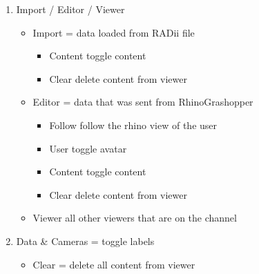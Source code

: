 \documentclass[letterpaper,10pt,english]{sphinxmanual}
\begin{document}
\sphinxAtStartPar
{}
\begin{enumerate}
%
\setcounter{enumi}{8}
\item {} 
\sphinxAtStartPar
Import / Editor / Viewer
\begin{itemize}
\item {} 
\sphinxAtStartPar
Import = data loaded from RADii file
\begin{itemize}
\item {} 
\sphinxAtStartPar
Content \sphinxhyphen{} toggle content

\item {} 
\sphinxAtStartPar
Clear \sphinxhyphen{} delete content from viewer

\end{itemize}

\item {} 
\sphinxAtStartPar
Editor = data that was sent from RhinoGrashopper
\begin{itemize}
\item {} 
\sphinxAtStartPar
Follow \sphinxhyphen{} follow the rhino view of the user

\item {} 
\sphinxAtStartPar
User toggle avatar

\item {} 
\sphinxAtStartPar
Content \sphinxhyphen{} toggle content

\item {} 
\sphinxAtStartPar
Clear \sphinxhyphen{} delete content from viewer

\end{itemize}

\item {} 
\sphinxAtStartPar
Viewer  all other viewers that are on the channel

\end{itemize}

\item {} 
\sphinxAtStartPar
Data \& Cameras = toggle labels
\begin{itemize}
\item {} 
\sphinxAtStartPar
Clear = delete all content from viewer

\end{itemize}

\end{enumerate}

\sphinxstepscope
\end{document}
